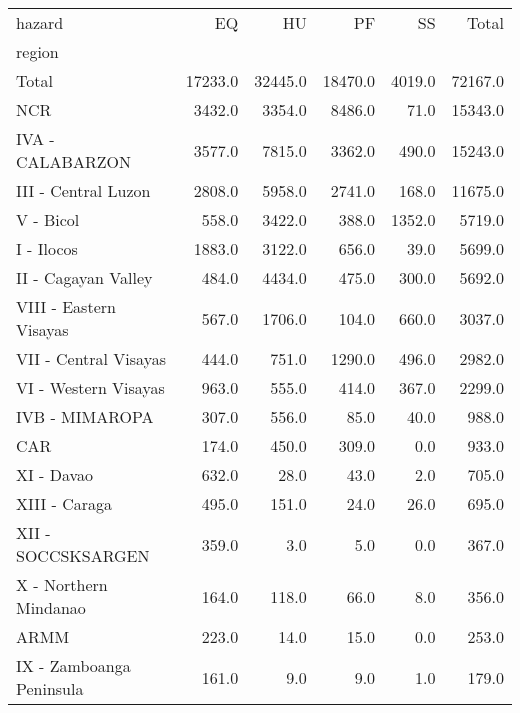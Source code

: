 \begin{tabular}{lrrrrr}
\toprule
hazard &       EQ &       HU &       PF &      SS &    Total \\
region                   &          &          &          &         &          \\
\midrule
Total                    &  17233.0 &  32445.0 &  18470.0 &  4019.0 &  72167.0 \\
NCR                      &   3432.0 &   3354.0 &   8486.0 &    71.0 &  15343.0 \\
IVA - CALABARZON         &   3577.0 &   7815.0 &   3362.0 &   490.0 &  15243.0 \\
III - Central Luzon      &   2808.0 &   5958.0 &   2741.0 &   168.0 &  11675.0 \\
V - Bicol                &    558.0 &   3422.0 &    388.0 &  1352.0 &   5719.0 \\
I - Ilocos               &   1883.0 &   3122.0 &    656.0 &    39.0 &   5699.0 \\
II - Cagayan Valley      &    484.0 &   4434.0 &    475.0 &   300.0 &   5692.0 \\
VIII - Eastern Visayas   &    567.0 &   1706.0 &    104.0 &   660.0 &   3037.0 \\
VII - Central Visayas    &    444.0 &    751.0 &   1290.0 &   496.0 &   2982.0 \\
VI - Western Visayas     &    963.0 &    555.0 &    414.0 &   367.0 &   2299.0 \\
IVB - MIMAROPA           &    307.0 &    556.0 &     85.0 &    40.0 &    988.0 \\
CAR                      &    174.0 &    450.0 &    309.0 &     0.0 &    933.0 \\
XI - Davao               &    632.0 &     28.0 &     43.0 &     2.0 &    705.0 \\
XIII - Caraga            &    495.0 &    151.0 &     24.0 &    26.0 &    695.0 \\
XII - SOCCSKSARGEN       &    359.0 &      3.0 &      5.0 &     0.0 &    367.0 \\
X - Northern Mindanao    &    164.0 &    118.0 &     66.0 &     8.0 &    356.0 \\
ARMM                     &    223.0 &     14.0 &     15.0 &     0.0 &    253.0 \\
IX - Zamboanga Peninsula &    161.0 &      9.0 &      9.0 &     1.0 &    179.0 \\
\bottomrule
\end{tabular}
